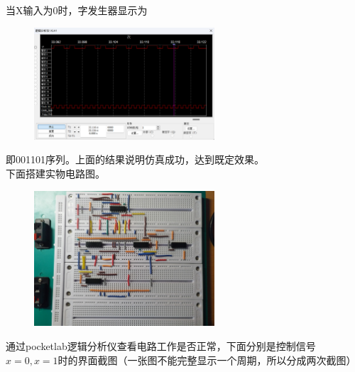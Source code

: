 \documentclass{ctexart}
\begin{document}
当X输入为0时，字发生器显示为
\begin{figure}[H]
    \centering
    \includegraphics[width=0.6\textwidth]{x=0.png}
\end{figure}
即001101序列。上面的结果说明仿真成功，达到既定效果。\\
下面搭建实物电路图。
\begin{figure}[H]
    \centering
    \includegraphics[width=0.6\textwidth]{实物图.jpg}
\end{figure}
通过pocketlab逻辑分析仪查看电路工作是否正常，下面分别是控制信号$x=0,x=1$时的界面截图（一张图不能完整显示一个周期，所以分成两次截图）
\end{document}
